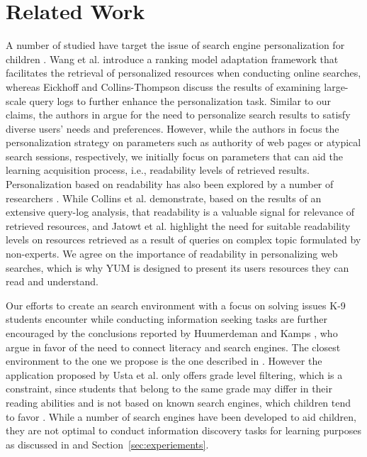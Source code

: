 \documentclass{sig-alternate-05-2015}
\begin{document}
\section{Related Work}
A number of studied have target the issue of search engine personalization for  children \cite{Col11, Eic13, Jat12, Wan13}. Wang et al. \cite{Wan13} introduce a ranking model adaptation framework that facilitates the retrieval of personalized resources when conducting online searches, whereas Eickhoff and Collins-Thompson \cite{Eic13} discuss the results of examining large-scale query logs to further enhance the personalization task. Similar to our claims, the authors in \cite{Eic13, Wan13} argue for the need to personalize search results to satisfy diverse users' needs and preferences. However, while the authors in \cite{Eic13, Wan13} focus the personalization strategy on parameters such as authority of web pages or atypical search sessions, respectively, we initially focus on parameters that can aid the learning acquisition process, i.e., readability levels of retrieved results. Personalization based on readability has also been explored by a number of researchers \cite{Col11, Jat12}. While Collins et al. \cite{Col11} demonstrate, based on the results of an extensive query-log analysis, that readability is a valuable signal for relevance of retrieved resources, and Jatowt et al. \cite{Jat12} highlight the need for suitable readability levels on resources retrieved as a result of queries on complex topic formulated by non-experts. We agree on the importance of readability in personalizing web searches, which is why YUM is designed to present its users resources they can read and understand.

 Our efforts to create an search environment with a focus on solving issues K-9 students encounter while conducting information seeking tasks are further encouraged by the conclusions reported by Huumerdeman and Kamps \cite{Huu15}, who argue in favor of the need to connect literacy and search engines. The closest environment to the one we propose is the one described in \cite{Ust14}. However the application proposed by Usta et al. only offers grade level filtering, which is a constraint, since students that belong to the same grade may differ in their reading abilities \cite{Bow92} and is not based on known search engines, which children tend to favor \cite{Bil13}. While a number of search engines have been developed to aid children, they are not optimal to conduct information discovery tasks for learning purposes as discussed in \cite{Gos13} and Section~\ref{sec:experiements}.
\end{document}
